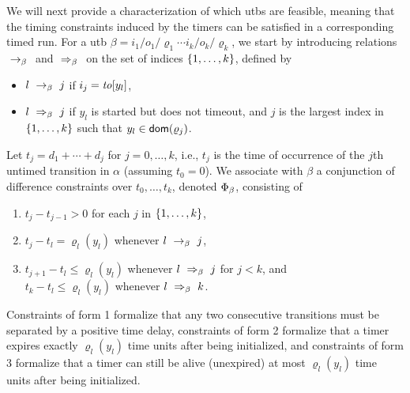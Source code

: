 We will next provide a characterization of which utbs are feasible, meaning
that the timing constraints induced by the timers can be satisfied in a
corresponding timed run. 
For a utb $\beta  =  {i_1/o_1/\varrho_1}  \cdots {i_k/o_k/\varrho_k}$,
we start by introducing relations $\ \rightarrow_{\beta} \ $ and $\ \Rightarrow_{\beta}\ $
on the set of indices $\lbrace 1, \ldots , k\rbrace$, defined by
\begin{itemize}
\item
  $l \ \rightarrow_{\beta} \  j$ if $i_j = \mathit{to}[y_l]$,
  \item
    $l \ \Rightarrow_{\beta}\  j$ if $y_l$ is started but does not timeout, and
    $j$ is the largest index in $\lbrace 1, \ldots , k\rbrace$
    such that $y_l \in {\textsf{dom}}(\varrho_{j})$.
\end{itemize}
Let $t_j = d_1 + \cdots + d_j$ for $j = 0 , \ldots, k$, i.e.,
$t_j$ is the time of occurrence of the $j$th untimed transition in $\alpha$
(assuming $t_0=0$).
We associate with $\beta$ a conjunction of difference constraints over
$t_0, \ldots, t_{k}$, denoted $\Phi_{\beta}$, consisting of
\begin{enumerate}
\item
$t_{j} - t_{j-1} > 0$ for each $j$ in $\lbrace 1, \ldots , k\rbrace$,
\item
$t_j - t_l = \varrho_l(y_l)$ whenever $l \ \rightarrow_{\beta} \  j$,
\item
  $t_{j+1} -t_l \leq \varrho_l(y_l)$ whenever $l \ \Rightarrow_{\beta}\  j$ for $j < k$, and
  \\
  $t_{k} -t_l \leq \varrho_l(y_l)$ whenever $l \ \Rightarrow_{\beta}\  k$.
\end{enumerate}
Constraints of form 1 formalize that any two consecutive transitions must
be separated by a positive time delay,
constraints of form 2 formalize that a timer expires exactly $\varrho_l(y_l)$
time units after being initialized, and
constraints of form 3 formalize that a timer can still be alive (unexpired)
at most $\varrho_l(y_l)$ time units after being initialized.

